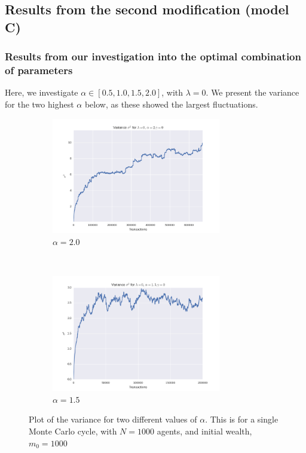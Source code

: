 \documentclass[a4paper, 10pt]{article}
\begin{document}
\subsection{Results from the second modification (model C)}
\subsubsection{Results from our investigation into the optimal combination of parameters}
Here, we investigate $\alpha \in [0.5, 1.0, 1.5, 2.0]$, with $\lambda=0$. We present the variance for the two highest $\alpha$ below, as these showed the largest fluctuations.\\
\linebreak
\begin{figure}[!ht] %
    \centering
    \begin{subfigure}[H!]{0.5\textwidth}
        \centering
        \includegraphics[height=2.0in]{varL0A2G0.png}
        \caption{$\alpha=2.0$}\label{fig:ModelC_Var_alpha_2}
    \end{subfigure}%
    ~ 
    \begin{subfigure}[H!]{0.5\textwidth}
        \centering
        \includegraphics[height=2.0in]{varL0A15G0.png}
        \caption{$\alpha=1.5$}\label{fig:ModelC_Var_alpha_15}
    \end{subfigure}
    \caption{Plot of the variance for two different values of $\alpha$. This is for a single Monte Carlo cycle, with $N=1000$ agents, and initial wealth, $m_0=1000$}\label{fig:ModelC_variance}
\end{figure}
\end{document}
